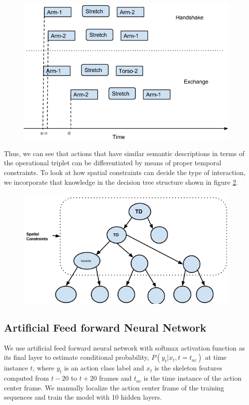 \documentclass[10pt,twocolumn,letterpaper]{article}
\begin{document}
\begin{figure}[ht]
\centering

  \includegraphics[scale = 0.4]{action_des.png}%
  \label{Fig:act_des}%

\end{figure}

Thus, we can see that actions that have similar semantic descriptions in terms of the operational triplet can be differentiated by means of proper temporal constraints. To look at how spatial constraints can decide the type of interaction, we incorporate that knowledge in the decision tree structure shown in figure \ref{Fig:tree}.

\begin{figure}[ht]
\centering

  \includegraphics[scale = 0.4]{dec_tree.png}%
  \label{Fig:tree}%

\end{figure}

\subsection{Artificial Feed forward Neural Network}
We use artificial feed forward neural network with softmax activation function as its final layer to estimate conditional probability, $P(y_t|x_t,t=t_{ac})$ at time instance $t$, where $y_t$ is an action class label and $x_t$ is the skeleton features computed from $t-20$ to $t+20$ frames and $t_{ac}$ is the time instance of the action center frame. We manually localize the action center frame of the training sequences and train the model with 10 hidden layers.
\end{document}
